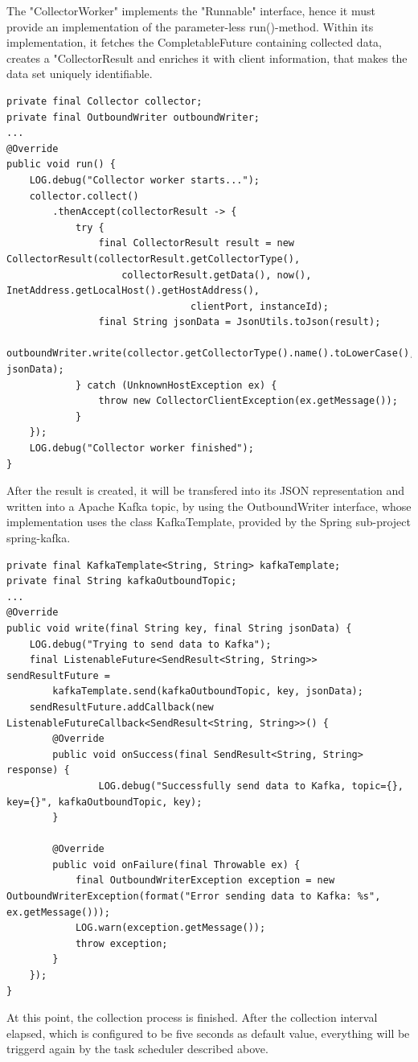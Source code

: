 The "CollectorWorker" implements the "Runnable" interface, hence it must provide an implementation of the parameter-less
run()-method. Within its implementation, it fetches the CompletableFuture containing collected data, creates a "CollectorResult and
enriches it with client information, that makes the data set uniquely identifiable.

\begin{lstlisting}[caption={"CollectorWorker", collector registry}, captionpos=b, label={lst:collector-worker}]
private final Collector collector;
private final OutboundWriter outboundWriter;
...
@Override
public void run() {
    LOG.debug("Collector worker starts...");
    collector.collect()
        .thenAccept(collectorResult -> {
            try {
                final CollectorResult result = new CollectorResult(collectorResult.getCollectorType(),
                    collectorResult.getData(), now(), InetAddress.getLocalHost().getHostAddress(),
                                clientPort, instanceId);
                final String jsonData = JsonUtils.toJson(result);
                outboundWriter.write(collector.getCollectorType().name().toLowerCase(), jsonData);
            } catch (UnknownHostException ex) {
                throw new CollectorClientException(ex.getMessage());
            }
    });
    LOG.debug("Collector worker finished");
}
\end{lstlisting}

After the result is created, it will be transfered into its JSON representation and written into a Apache Kafka topic, by using
the OutboundWriter interface, whose implementation uses the class KafkaTemplate, provided by the Spring sub-project spring-kafka.

\begin{lstlisting}[caption={"KafkaOutboundWriter", Send data}, captionpos=b, label={lst:outbound-writer}]
private final KafkaTemplate<String, String> kafkaTemplate;
private final String kafkaOutboundTopic;
...
@Override
public void write(final String key, final String jsonData) {
    LOG.debug("Trying to send data to Kafka");
    final ListenableFuture<SendResult<String, String>> sendResultFuture =
        kafkaTemplate.send(kafkaOutboundTopic, key, jsonData);
    sendResultFuture.addCallback(new ListenableFutureCallback<SendResult<String, String>>() {
        @Override
        public void onSuccess(final SendResult<String, String> response) {
                LOG.debug("Successfully send data to Kafka, topic={}, key={}", kafkaOutboundTopic, key);
        }

        @Override
        public void onFailure(final Throwable ex) {
            final OutboundWriterException exception = new OutboundWriterException(format("Error sending data to Kafka: %s", ex.getMessage()));
            LOG.warn(exception.getMessage());
            throw exception;
        }
    });
}
\end{lstlisting}
At this point, the collection process is finished. After the collection interval elapsed, which is configured to be five seconds as
default value, everything will be triggerd again by the task scheduler described above.

